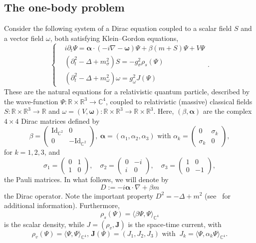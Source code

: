 \documentclass[AHL,Unicode,longabstracts,published]{cedram}
\newcommand{\rmId}{\mathrm{Id}}
\newcommand\R{\mathbb{R}}
\newcommand\C{\mathbb{C}}
\begin{document}
\subsection{The one-body problem}
Consider the following system of a Dirac equation coupled to a scalar field $S$ and a vector field $\omega$, both satisfying Klein--Gordon equations,
\begin{equation}\label{eqRMFTgeneral}
\begin{cases}
&i\partial_t \Psi=\bm \alpha \cdot (-i\nabla - \bm \omega)\Psi +\beta (m+S)\Psi +V\Psi\\
&\left(\partial^2_t-\Delta+m_\sigma^2\right)S=-g_\sigma^2\rho_s(\Psi)\\
&\left(\partial^2_t-\Delta+m_\omega^2\right)\omega=g_\omega^2 J(\Psi)
\end{cases}.
\end{equation}
These are the natural equations for a relativistic quantum particle, described by the wave-function $\Psi:\R\times \R^3\to \C^4$, coupled to relativistic (massive) classical fields $S:\R\times \R^3\to \R$ and $\omega=(V,\bm \omega):\R\times \R^3\to \R\times \R^3$. Here, $(\beta,\bm \alpha)$ are the complex $4\times 4$ Dirac matrices defined by
\begin{equation}
\beta=
\begin{pmatrix}
\rmId_{\C^2} & 0\\
0 & -\rmId_{\C^2}
\end{pmatrix},\
\bm \alpha=(\alpha_1,\alpha_2,\alpha_3) \text{ with } \alpha_k=
\begin{pmatrix}
0 & \sigma_k\\
\sigma_k & 0
\end{pmatrix},
\end{equation}
for $k=1,2,3$, and
\begin{equation}
\sigma_1=
\begin{pmatrix}
0 & 1\\
1 & 0
\end{pmatrix},\quad
\sigma_2=
\begin{pmatrix}
0 & -i\\
i & 0
\end{pmatrix},\quad
\sigma_3=
\begin{pmatrix}
1 & 0\\
0 & -1
\end{pmatrix},
\end{equation}
the Pauli matrices. In what follows, we will denote by
\begin{equation*}
D:=-i \bm \alpha \cdot \nabla +\beta m
\end{equation*}
the Dirac operator. Note the important property $D^2=-\Delta+m^2$ (see~\cite{thaller} for additional information).
Furthermore,
\begin{equation}\label{def.rhos}
\rho_s(\Psi)=\langle\beta\Psi,\Psi\rangle_{\C^4}
\end{equation}
is the scalar density, while $J=(\rho_v,\bm J)$ is the space-time current, with
\begin{equation}\label{def.j}
\rho_v(\Psi)=\langle\Psi,\Psi\rangle_{\C^4}, \,\bm J(\Psi)=(J_1,J_2,J_3) \text{ with } \ J_k=\langle\Psi,\alpha_k\Psi\rangle_{\C^4}.
\end{equation}
\end{document}
